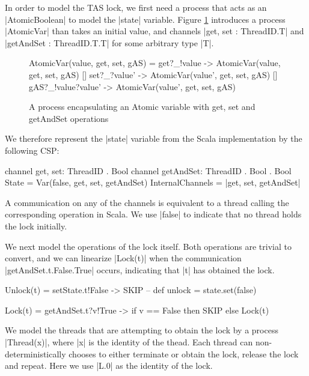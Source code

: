 \inlineCSP

In order to model the TAS lock, we first need a process that acts as an |AtomicBoolean| to model the |state| variable. Figure \ref{csp:Variable} introduces a process |AtomicVar| than takes an initial value, and channels |get, set : ThreadID.T| and |getAndSet : ThreadID.T.T| for some arbitrary type |T|.

\begin{figure}
  \begin{cspm}
AtomicVar(value, get, set, gAS) = 
     get?_!value -> AtomicVar(value, get, set, gAS)
  [] set?_?value' -> AtomicVar(value', get, set, gAS)
  [] gAS?_!value?value' -> AtomicVar(value', get, set, gAS) 
  \end{cspm}
  \caption{A process encapsulating an Atomic variable with get, set and getAndSet operations}
  \label{csp:Variable}
\end{figure}

We therefore represent the |state| variable from the Scala implementation by the following CSP:
\begin{cspm}
  channel get, set: ThreadID . Bool
  channel getAndSet: ThreadID . Bool . Bool
  State = Var(false, get, set, getAndSet)
  InternalChannels = {|get, set, getAndSet|}
\end{cspm}
A communication on any of the channels is equivalent to a thread calling the corresponding operation in Scala. We use |false| to indicate that no thread holds the lock initially.

We next model the operations of the lock itself. Both operations are trivial to convert, and we can linearize |Lock(t)| when the communication |getAndSet.t.False.True| occurs, indicating that |t| has obtained the lock.

\begin{cspm}
  Unlock(t) = setState.t!False -> SKIP -- def unlock = state.set(false)

  Lock(t) = getAndSet.t?v!True -> if v == False then SKIP 
                                    else Lock(t)
\end{cspm}



We model the threads that are attempting to obtain the lock by a process |Thread(x)|, where |x| is the identity of the thead. Each thread can non-deterministically chooses to either terminate or obtain the lock, release the lock and repeat. %
Here we use |L.0| as the identity of the lock.

